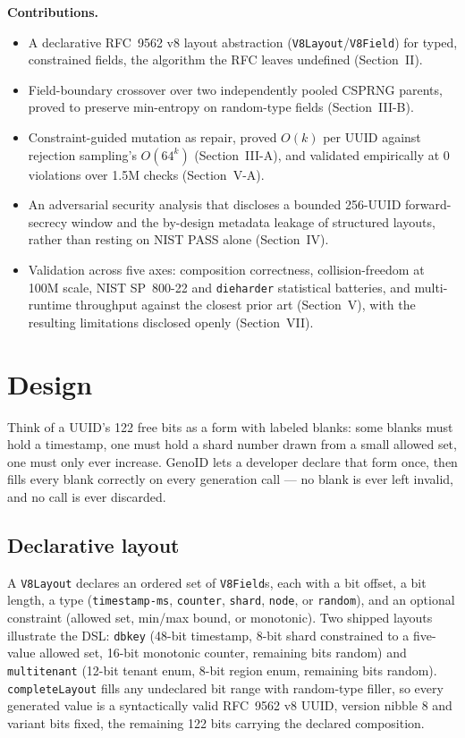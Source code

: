 \documentclass[conference]{IEEEtran}
\begin{document}
\noindent\textbf{Contributions.}

\begin{itemize}
    \item A declarative RFC~9562 v8 layout abstraction (\texttt{V8Layout}/\texttt{V8Field}) for typed, constrained fields, the algorithm the RFC leaves undefined (Section~II).
    
    \item Field-boundary crossover over two independently pooled CSPRNG parents, proved to preserve min-entropy on random-type fields (Section~III-B).
    
    \item Constraint-guided mutation as repair, proved $O(k)$ per UUID against rejection sampling's $O(64^k)$ (Section~III-A), and validated empirically at 0 violations over 1.5M checks (Section~V-A).
    
    \item An adversarial security analysis that discloses a bounded 256-UUID forward-secrecy window and the by-design metadata leakage of structured layouts, rather than resting on NIST PASS alone (Section~IV).
    
    \item Validation across five axes: composition correctness, collision-freedom at 100M scale, NIST SP~800-22 and \texttt{dieharder} statistical batteries, and multi-runtime throughput against the closest prior art (Section~V), with the resulting limitations disclosed openly (Section~VII).
\end{itemize}

\section{Design}

Think of a UUID's 122 free bits as a form with labeled blanks: some blanks must hold a timestamp, one must hold a shard number drawn from a small allowed set, one must only ever increase. GenoID lets a developer declare that form once, then fills every blank correctly on every generation call — no blank is ever left invalid, and no call is ever discarded.

\subsection{Declarative layout}

A \texttt{V8Layout} declares an ordered set of \texttt{V8Field}s, each with a bit offset, a bit length, a type (\texttt{timestamp-ms}, \texttt{counter}, \texttt{shard}, \texttt{node}, or \texttt{random}), and an optional constraint (allowed set, min/max bound, or monotonic). Two shipped layouts illustrate the DSL: \texttt{dbkey} (48-bit timestamp, 8-bit shard constrained to a five-value allowed set, 16-bit monotonic counter, remaining bits random) and \texttt{multitenant} (12-bit tenant enum, 8-bit region enum, remaining bits random). \texttt{completeLayout} fills any undeclared bit range with random-type filler, so every generated value is a syntactically valid RFC~9562 v8 UUID, version nibble 8 and variant bits fixed, the remaining 122 bits carrying the declared composition.
\end{document}
